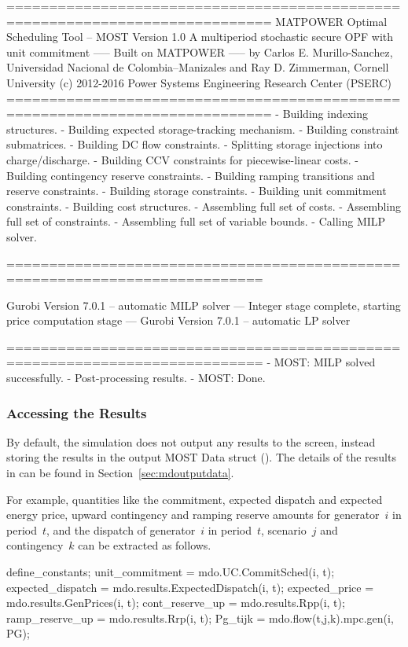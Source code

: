 \documentclass[12pt]{article}
\newcommand{\most}[0]{{MOST}}
\newcommand{\md}[0]{{\most{} Data struct}}
\newcommand{\code}[1]{{\relsize{-0.5}{\tt{{#1}}}}}  %
\numberwithin{equation}{section}
\numberwithin{table}{section}
\numberwithin{figure}{section}
\begin{document}
\begin{Code}
=============================================================================
          MATPOWER Optimal Scheduling Tool  --  MOST Version 1.0
          A multiperiod stochastic secure OPF with unit commitment
                       -----  Built on MATPOWER  -----
  by Carlos E. Murillo-Sanchez, Universidad Nacional de Colombia--Manizales
                  and Ray D. Zimmerman, Cornell University
       (c) 2012-2016 Power Systems Engineering Research Center (PSERC)       
=============================================================================
- Building indexing structures.
- Building expected storage-tracking mechanism.
- Building constraint submatrices.
  - Building DC flow constraints.
  - Splitting storage injections into charge/discharge.
  - Building CCV constraints for piecewise-linear costs.
  - Building contingency reserve constraints.
  - Building ramping transitions and reserve constraints.
  - Building storage constraints.
  - Building unit commitment constraints.
- Building cost structures.
- Assembling full set of costs.
- Assembling full set of constraints.
- Assembling full set of variable bounds.
- Calling MILP solver.

============================================================================

Gurobi Version 7.0.1 -- automatic MILP solver
--- Integer stage complete, starting price computation stage ---
Gurobi Version 7.0.1 -- automatic LP solver

============================================================================
- MOST: MILP solved successfully.
- Post-processing results.
- MOST: Done.
\end{Code}

\subsubsection{Accessing the Results}

By default, the simulation does not output any results to the screen, instead storing the results in the output \md{} (\code{mdo}).
The details of the results in \code{mdo} can be found in Section~\ref{sec:mdoutputdata}.

For example, quantities like the commitment, expected dispatch and expected energy price, upward contingency and ramping reserve amounts for generator~$i$ in period~$t$, and the dispatch of generator~$i$ in period~$t$, scenario~$j$ and contingency~$k$ can be extracted as follows.
\begin{Code}
define_constants;
unit_commitment     = mdo.UC.CommitSched(i, t);
expected_dispatch   = mdo.results.ExpectedDispatch(i, t);
expected_price      = mdo.results.GenPrices(i, t);
cont_reserve_up     = mdo.results.Rpp(i, t);
ramp_reserve_up     = mdo.results.Rrp(i, t);
Pg_tijk             = mdo.flow(t,j,k).mpc.gen(i, PG);
\end{Code}
\end{document}
